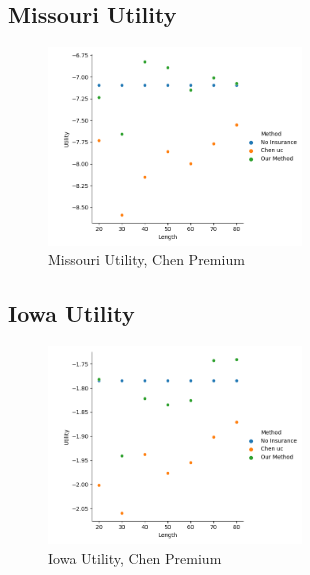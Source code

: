 \documentclass[11pt]{article}
\begin{document}
    \subsection{Missouri Utility}
        \begin{figure}[h]
            \centering
            \includegraphics[width=0.6\textwidth]{../../../output/figures//Chen Premium/Missouri_Utility_Length_ml1241.png}
            \caption{Missouri Utility, Chen Premium}
        \end{figure}
        \FloatBarrier

    \subsection{Iowa Utility}
    \begin{figure}[h]
        \centering
        \includegraphics[width=0.6\textwidth]{../../../output/figures/Chen Premium/Iowa_Utility_Length_ml1241.png}
        \caption{Iowa Utility, Chen Premium}
    \end{figure}
    \FloatBarrier
\end{document}
